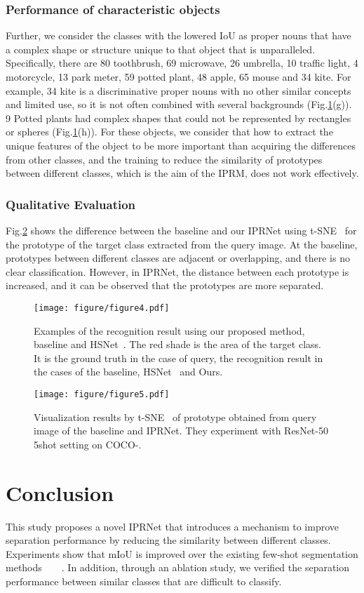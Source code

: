 \documentclass[runningheads]{llncs}
\begin{document}
\subsubsection{Performance of characteristic objects}
Further, we consider the classes with the lowered IoU as proper nouns that have a complex shape or structure unique to that object that is unparalleled.
Specifically, there are 80 toothbrush, 69 microwave, 26 umbrella, 10 traffic light, 4 motorcycle, 13 park meter, 59 potted plant, 48 apple, 65 mouse and 34 kite.
For example, 34 kite is a discriminative proper nouns with no other similar concepts and limited use, so it is not often combined with several backgrounds (Fig.\ref{fig:com_img}(g)).
9 Potted plants had complex shapes that could not be represented by rectangles or spheres (Fig.\ref{fig:com_img}(h)).
For these objects, we consider that how to extract the unique features of the object to be more important than acquiring the differences from other classes, and the training to reduce the similarity of prototypes between different classes, which is the aim of the IPRM, does not work effectively.
\subsubsection{Qualitative Evaluation}
Fig.\ref{fig:tsne} shows the difference between the baseline and our IPRNet using t-SNE~\cite{tsne} for the prototype of the target class extracted from the query image.
At the baseline, prototypes between different classes are adjacent or overlapping, and there is no clear classification. 
However, in IPRNet, the distance between each prototype is increased, and it can be observed that the prototypes are more separated.
\begin{figure}[htb]
  \texttt{[image: figure/figure4.pdf]}
  \caption{Examples of the recognition result using our proposed method, baseline and HSNet~\cite{HSNet}. The red shade is the area of the target class. It is the ground truth in the case of query, the recognition result in the cases of the baseline, HSNet~\cite{HSNet} and Ours.}
  \label{fig:com_img}
\end{figure}
\begin{figure}[h]
  \texttt{[image: figure/figure5.pdf]}
  \caption{Visualization results by t-SNE~\cite{tsne} of prototype obtained from query image of the baseline and IPRNet.
  They experiment with ResNet-50 5shot setting on COCO-.}
  \label{fig:tsne}
\end{figure}
\section{Conclusion}
This study proposes a novel IPRNet that introduces a mechanism to improve separation performance by reducing the similarity between different classes.
Experiments show that mIoU is improved over the existing few-shot segmentation methods~\cite{PPNet}~\cite {PFENet}~\cite {MLC}~\cite{HSNet}. 
In addition, through an ablation study, we verified the separation performance between similar classes that are difficult to classify.
\end{document}
